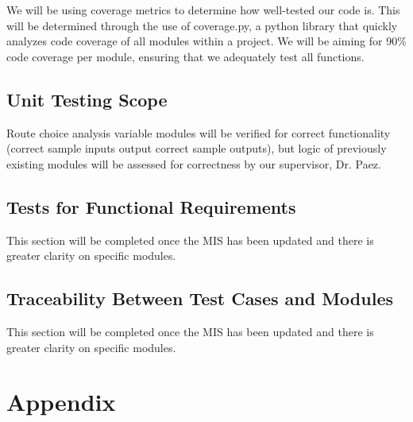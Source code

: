 \documentclass[12pt, titlepage]{article}
\begin{document}
\noindent We will be using coverage metrics to determine how well-tested our code is. This will be determined through the use of coverage.py, a python library that quickly analyzes code coverage of all modules within a project. We will be aiming for 90\% code coverage per module, ensuring that we adequately test all functions. 

\subsection{Unit Testing Scope}

Route choice analysis variable modules will be verified for correct functionality (correct sample inputs output correct sample outputs), but logic of previously existing modules will be assessed for correctness by our supervisor, Dr. Paez.

\subsection{Tests for Functional Requirements}

This section will be completed once the MIS has been updated and there is greater clarity on specific modules. 

\subsection{Traceability Between Test Cases and Modules}
This section will be completed once the MIS has been updated and there is greater clarity on specific modules. 
				




\newpage

\section{Appendix}
\end{document}
